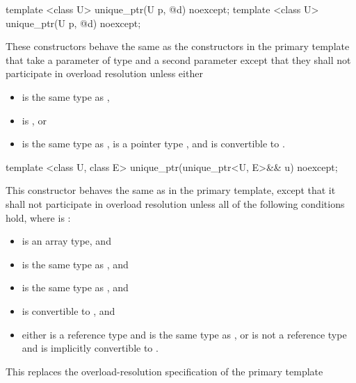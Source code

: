 %
\begin{itemdecl}
template <class U> unique_ptr(U p, @\seebelow@ d) noexcept;
template <class U> unique_ptr(U p, @\seebelow@ d) noexcept;
\end{itemdecl}

\begin{itemdescr}
\pnum
These constructors behave the same as
the constructors in the primary template that
take a parameter of type  and a second parameter
except that they
shall not participate in overload resolution unless either

\begin{itemize}
\item {} is the same type as ,
\item {} is , or
\item {} is the same type as ,
       is a pointer type , and
       is convertible to .
\end{itemize}
\end{itemdescr}

%
\begin{itemdecl}
template <class U, class E>
  unique_ptr(unique_ptr<U, E>&& u) noexcept;
\end{itemdecl}

\begin{itemdescr}
\pnum
This constructor behaves the same as in the primary template,
except that it shall not participate in overload resolution
unless all of the following conditions hold,
where  is :

\begin{itemize}
\item {} is an array type, and
\item {} is the same type as , and
\item {} is the same type as , and
\item {} is convertible to , and
\item either  is a reference type and  is the same type as ,
      or  is not a reference type and  is implicitly convertible to .
\end{itemize}

\begin{note}
This replaces the overload-resolution specification of the primary template
\end{note}
\end{itemdescr}

